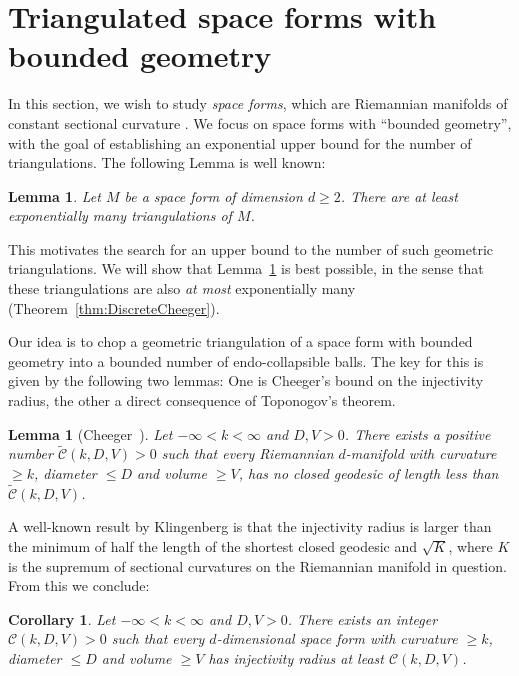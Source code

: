 \documentclass[a4paper,11pt]{article}
\theoremstyle{plain}
\newtheorem{cor}[theorem]{Corollary}
\newtheorem{lemma}[theorem]{Lemma}
\theoremstyle{definition}
\begin{document}
\section{Triangulated space forms with bounded geometry}
In this section, we wish to study \emph{space forms}, which are Riemannian manifolds of constant sectional curvature \cite{CheegerComp}. We focus on space forms with ``bounded geometry'', with the goal of establishing an exponential upper bound for the number of triangulations. The following Lemma is well known:

\begin{lemma} \label{lem:lowerbound}
Let $M$ be a space form of dimension $d \ge 2$. There are \emph{at least} exponentially many triangulations of $M$. 
\end{lemma}

This motivates the search for an upper bound to the number of such geometric triangulations. We will show that Lemma~\ref{lem:lowerbound} is best possible, in the sense that these triangulations are also \emph{at most} exponentially many (Theorem~\ref{thm:DiscreteCheeger}). 

Our idea is to chop a geometric triangulation of a space form with bounded geometry into a bounded number of endo-collapsible balls. The key for this is given by the following two lemmas: One is Cheeger's bound on the injectivity radius, the other a direct consequence of Toponogov's theorem.


\begin{lemma}[Cheeger~\cite{CheegerCrit}]
Let $-\infty<k<\infty$ and $D,V>0$. There exists a positive number $\widetilde{\mathcal{C}}(k,D,V)>0$ such that every Riemannian $d$-manifold with 
curvature $\ge k$, diameter $\le D$ and volume $\ge V$, 
has no closed geodesic of length less than $\widetilde{\mathcal{C}}(k,D,V)$.
\end{lemma}

A well-known result by Klingenberg is that the injectivity radius is larger than the minimum of half the length of the shortest closed geodesic and $\sqrt{K}$, where $K$ is the supremum of sectional curvatures on the Riemannian manifold in question. From this we conclude:

\begin{cor}
Let $-\infty<k<\infty$ and $D,V>0$. There exists an integer $\mathcal{C}(k,D,V)>0$ such that every $d$-dimensional space form with 
curvature $\ge k$, diameter $\le D$ and volume $\ge V$ has injectivity radius at least $\mathcal{C}(k,D,V)$.
\end{cor}
\end{document}
